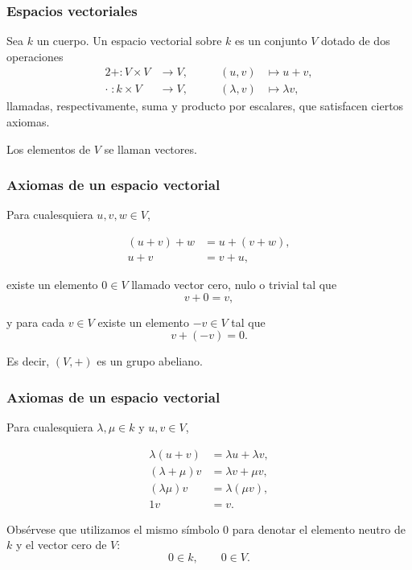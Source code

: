 \begin{frame}
    \frametitle{Espacios vectoriales}

    \begin{definition}
        Sea \(k\) un cuerpo. Un \alert{espacio vectorial sobre \(k\)} es un conjunto \(V\)
        dotado de dos operaciones
        \begin{alignat*}{2}
            +\colon V\times V &\longrightarrow V, \qquad &(u,v) &\longmapsto u+v,\\
            \cdot\;\colon k\times V &\longrightarrow V, \qquad &(\lambda,v) &\longmapsto \lambda v,
        \end{alignat*}
        llamadas, respectivamente, \alert{suma} y \alert{producto por escalares},
        que satisfacen ciertos axiomas.
    \end{definition}

    \medskip

    Los elementos de \(V\) se llaman \alert{vectores}.
\end{frame}


\begin{frame}
    \frametitle{Axiomas de un espacio vectorial}

    Para cualesquiera \(u,v,w\in V\),

    \begin{align*}
        (u+v)+w &= u+(v+w),\\
        u+v &= v+u,
    \end{align*}

    existe un elemento \(0\in V\) llamado \alert{vector cero}, \alert{nulo} o \alert{trivial} tal que
    \[
        v+0=v,
    \]

    y para cada \(v\in V\) existe un elemento \(-v\in V\) tal que
    \[
        v+(-v)=0.
    \]

    \medskip

    Es decir, \((V,+)\) es un \alert{grupo abeliano}.
\end{frame}


\begin{frame}
    \frametitle{Axiomas de un espacio vectorial}

    Para cualesquiera \(\lambda,\mu\in k\) y \(u,v\in V\),

    \begin{align*}
        \lambda(u+v) &= \lambda u+\lambda v,\\
        (\lambda+\mu)v &= \lambda v+\mu v,\\
        (\lambda\mu)v &= \lambda(\mu v),\\
        1v &= v.
    \end{align*}

    \medskip

    Obsérvese que utilizamos el mismo símbolo \(0\) para denotar
    el elemento neutro de \(k\) y el vector cero de \(V\):
    \[
        0\in k,
        \qquad
        0\in V.
    \]
\end{frame}



